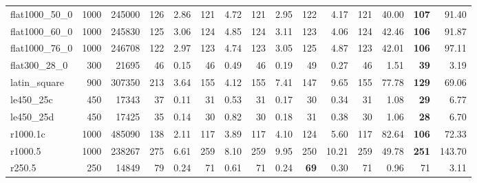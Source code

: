 \begin{table*}
\begin{adjustbox}{width=\textwidth}
\begin{minipage}[b]{\textwidth}
\begin{tabular}{@{} lrrrrrrrrrrrrrr @{}}
flat1000\_50\_0 & 1000 & 245000 & 126 & 2.86 & 121 & 4.72 & 121 & 2.95 & 122 & 4.17 & 121 & 40.00 & \textbf{107} & 91.40 \\
flat1000\_60\_0 & 1000 & 245830 & 125 & 3.06 & 124 & 4.85 & 124 & 3.11 & 123 & 4.06 & 124 & 42.46 & \textbf{106} & 91.87 \\
flat1000\_76\_0 & 1000 & 246708 & 122 & 2.97 & 123 & 4.74 & 123 & 3.05 & 125 & 4.87 & 123 & 42.01 & \textbf{106} & 97.11 \\
flat300\_28\_0 & 300 & 21695 & 46 & 0.15 & 46 & 0.49 & 46 & 0.19 & 49 & 0.27 & 46 & 1.51 & \textbf{39} & 3.19 \\
latin\_square & 900 & 307350 & 213 & 3.64 & 155 & 4.12 & 155 & 7.41 & 147 & 9.65 & 155 & 77.78 & \textbf{129} & 69.06 \\
le450\_25c & 450 & 17343 & 37 & 0.11 & 31 & 0.53 & 31 & 0.17 & 30 & 0.34 & 31 & 1.08 & \textbf{29} & 6.77 \\
le450\_25d & 450 & 17425 & 35 & 0.14 & 30 & 0.82 & 30 & 0.18 & 31 & 0.38 & 30 & 1.06 & \textbf{28} & 6.70 \\
r1000.1c & 1000 & 485090 & 138 & 2.11 & 117 & 3.89 & 117 & 4.10 & 124 & 5.60 & 117 & 82.64 & \textbf{106} & 72.33 \\
r1000.5 & 1000 & 238267 & 275 & 6.61 & 259 & 8.10 & 259 & 9.95 & 250 & 10.21 & 259 & 49.78 & \textbf{251} & 143.70 \\
r250.5 & 250 & 14849 & 79 & 0.24 & 71 & 0.61 & 71 & 0.24 & \textbf{69} & 0.30 & 71 & 0.96 & 71 & 3.11 \\
\bottomrule
\end{tabular}
\end{minipage}
\end{adjustbox}
\end{table*}